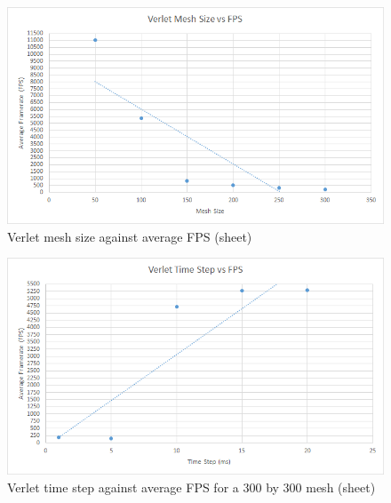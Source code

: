     \begin{figure}
    \begin{center}
      \includegraphics[scale=.9]{Figures/sheet_v_m_fps}
    \end{center}
    \caption{Verlet mesh size against average FPS (sheet)}
    \label{fig:v mesh fps sheet}
  \end{figure}
  
    \begin{figure}
    \begin{center}
      \includegraphics[scale=.9]{Figures/sheet_v_ts_fps}
    \end{center}
    \caption{Verlet time step against average FPS for a 300 by 300 mesh (sheet)}
    \label{fig:v step fps sheet}
  \end{figure}
  
